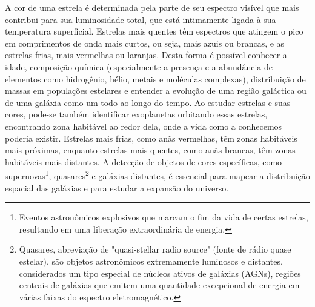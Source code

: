 
A cor de uma estrela é determinada pela parte de seu espectro visível que mais contribui para sua luminosidade total, que está intimamente ligada à sua temperatura superficial. Estrelas mais quentes têm espectros que atingem o pico em comprimentos de onda mais curtos, ou seja, mais azuis ou brancas, e as estrelas frias, mais vermelhas ou laranjas. Desta forma é possível conhecer a idade, composição química (especialmente a presença e a abundância de elementos como hidrogênio, hélio, metais e moléculas complexas), distribuição de massas em populações estelares e entender a evolução de uma região galáctica ou de uma galáxia como um todo ao longo do tempo. Ao estudar estrelas e suas cores, pode-se também identificar exoplanetas orbitando essas estrelas, encontrando zona habitável ao redor dela, onde a vida como a conhecemos poderia existir. Estrelas mais frias, como anãs vermelhas, têm zonas habitáveis mais próximas, enquanto estrelas mais quentes, como anãs brancas, têm zonas habitáveis mais distantes. A detecção de objetos de cores específicas, como supernovas\footnote[3]{Eventos astronômicos explosivos que marcam o fim da vida de certas estrelas, resultando em uma liberação extraordinária de energia.}, quasares\footnote[4]{Quasares, abreviação de "quasi-stellar radio source" (fonte de rádio quase estelar), são objetos astronômicos extremamente luminosos e distantes, considerados um tipo especial de núcleos ativos de galáxias (AGNs), regiões centrais de galáxias que emitem uma quantidade excepcional de energia em várias faixas do espectro eletromagnético.} e galáxias distantes, é essencial para mapear a distribuição espacial das galáxias e para estudar a expansão do universo.

